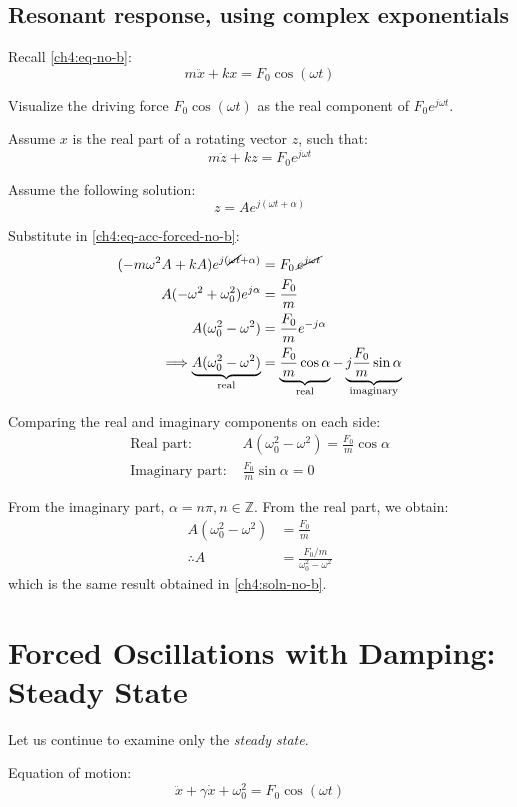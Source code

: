 \subsection{Resonant response, using complex exponentials}
Recall \eqref{ch4:eq-no-b}:
\[ m\ddot{x} + kx = F_0 \cos(\omega t) \]

Visualize the driving force $F_0 \cos(\omega t)$ as the real component of $F_0 e^{j\omega t}$.

Assume $x$ is the real part of a rotating vector $z$, such that:
\[ m\ddot{z} + kz = F_0 e^{j\omega t}\]

Assume the following solution:
\[z = Ae^{j(\omega t+\alpha)} \]

Substitute in \eqref{ch4:eq-acc-forced-no-b}:
\begin{align*}
	(-m\omega^2 A + kA)e^{j(\cancel{\omega t} + \alpha)} &= F_0 \, \cancel{e^{j\omega t}} \\
	A(-\omega^2 + \omega_0^2)e^{j\alpha} &= \frac{F_0}{m} \\
	A(\omega_0^2 - \omega^2 ) &= \frac{F_0}{m} e^{-j\alpha} \\
	\Longrightarrow
	\underbrace{A(\omega_0^2 - \omega^2 )}_\text{real} &= \underbrace{\frac{F_0}{m} \cos\alpha}_\text{real} - \underbrace{j\frac{F_0}{m} \sin\alpha}_\text{imaginary}
\end{align*}

Comparing the real and imaginary components on each side:
\begin{align*}
	\text{Real part: } & A(\omega_0^2 - \omega^2 ) = \frac{F_0}{m} \cos\alpha \\
	\text{Imaginary part: } & \frac{F_0}{m} \sin\alpha = 0 
\end{align*}

From the imaginary part, $\alpha = n\pi, n\in\mathbb{Z}$. From the real part, we obtain:
\begin{align*}
	A(\omega_0^2 - \omega^2 ) &= \frac{F_0}{m} \\
	\therefore
	A &= \frac{F_0/m}{\omega_0^2 - \omega^2 }
\end{align*}
which is the same result obtained in \eqref{ch4:soln-no-b}.

\section{Forced Oscillations with Damping: Steady State}

Let us continue to examine only the \emph{steady state}.

Equation of motion:
\[ \ddot{x} + \gamma\dot{x} + \omega_0^2 = F_0 \cos(\omega t) \]

